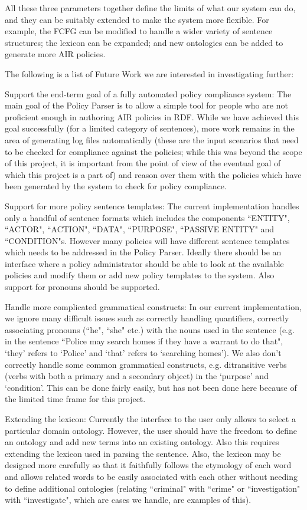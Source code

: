 \documentclass{llncs}
\begin{document}
All these three parameters together define the limits of what our system can do, and they can be suitably extended to make the system more flexible. For example, the FCFG can be modified to handle a wider variety of sentence structures; the lexicon can be expanded; and new ontologies can be added to generate more AIR policies.

The following is a list of Future Work we are interested in investigating further:

Support the end-term goal of a fully automated policy compliance system: The main goal of the Policy Parser is to allow a simple tool for people who are not proficient enough in authoring AIR policies in RDF. While we have achieved this goal successfully (for a limited category of sentences), more work remains in the area of generating log files automatically (these are the input scenarios that need to be checked for compliance against the policies; while this was beyond the scope of this project, it is important from the point of view of the eventual goal of which this project is a part of) and reason over them with the policies which have been generated by the system to check for policy compliance.

Support for more policy sentence templates: The current implementation handles only a handful of sentence formats which includes the components ``ENTITY", ``ACTOR", ``ACTION", ``DATA", ``PURPOSE", ``PASSIVE ENTITY" and ``CONDITION"s. However many policies will have different sentence templates which needs to be addressed in the Policy Parser. Ideally there should be an interface where a policy administrator should be able to look at the available policies and modify them or add new policy templates to the system. Also support for pronouns should be supported.

Handle more complicated grammatical constructs: In our current implementation, we ignore many difficult issues such as correctly handling quantifiers, correctly associating pronouns (``he", ``she" etc.) with the nouns used in the sentence (e.g. in the sentence ``Police may search homes if they have a warrant to do that", `they' refers to `Police' and `that' refers to `searching homes'). We also don't correctly handle some common grammatical constructs, e.g. ditransitive verbs (verbs with both a primary and a secondary object) in the `purpose' and `condition'. This can be done fairly easily, but has not been done here because of the limited time frame for this project.

Extending the lexicon: Currently the interface to the user only allows to select a particular domain ontology. However, the user should have the freedom to define an ontology and add new terms into an existing ontology. Also this requires extending the lexicon used in parsing the sentence. Also, the lexicon may be designed more carefully so that it faithfully follows the etymology of each word and allows related words to be easily associated with each other without needing to define additional ontologies (relating ``criminal" with ``crime" or ``investigation" with ``investigate", which are cases we handle, are examples of this).
\end{document}
